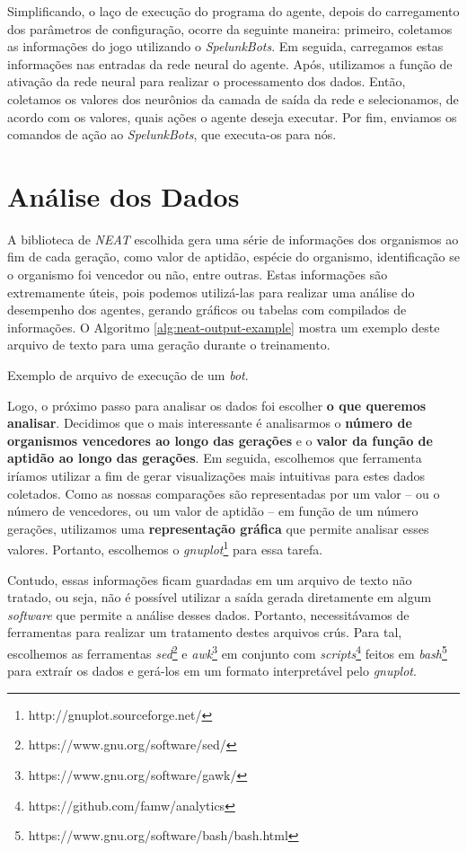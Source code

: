 Simplificando, o laço de execução do programa do agente, depois do carregamento
dos parâmetros de configuração, ocorre da seguinte maneira: primeiro, coletamos
as informações do jogo utilizando o \textit{SpelunkBots}. Em seguida, carregamos
estas informações nas entradas da rede neural do agente. Após, utilizamos a
função de ativação da rede neural para realizar o processamento dos dados.
Então, coletamos os valores dos neurônios da camada de saída da rede e
selecionamos, de acordo com os valores, quais ações o agente deseja executar.
Por fim, enviamos os comandos de ação ao \textit{SpelunkBots}, que executa-os
para nós.


\section{\label{section:analytics}Análise dos Dados}

A biblioteca de \textit{NEAT} escolhida gera uma série de informações dos
organismos ao fim de cada geração, como valor de aptidão, espécie do organismo,
identificação se o organismo foi vencedor ou não, entre outras. Estas
informações são extremamente úteis, pois podemos utilizá-las para realizar uma
análise do desempenho dos agentes, gerando gráficos ou tabelas com compilados de
informações. O Algoritmo \ref{alg:neat-output-example} mostra um exemplo deste
arquivo de texto para uma geração durante o treinamento.

\begin{algorithm}[H]

\caption[Exemplo de arquivo de execução de um \textit{bot}.]
{\label{alg:neat-output-example}Exemplo de arquivo de execução de um
    \textit{bot}.}
\end{algorithm}

Logo, o próximo passo para analisar os dados foi escolher \textbf{o que queremos
analisar}. Decidimos que o mais interessante é analisarmos o \textbf{número de
organismos vencedores ao longo das gerações} e o \textbf{valor da função de
aptidão ao longo das gerações}. Em seguida, escolhemos que ferramenta iríamos
utilizar a fim de gerar visualizações mais intuitivas para estes dados
coletados. Como as nossas comparações são representadas por um valor -- ou o
número de vencedores, ou um valor de aptidão -- em função de um número gerações,
utilizamos uma \textbf{representação gráfica} que permite analisar esses
valores. Portanto, escolhemos o
\textit{gnuplot}\footnote{http://gnuplot.sourceforge.net/} para essa tarefa.

Contudo, essas informações ficam guardadas em um arquivo de texto não tratado,
ou seja, não é possível utilizar a saída gerada diretamente em algum
\textit{software} que permite a análise desses dados. Portanto, necessitávamos
de ferramentas para realizar um tratamento destes arquivos crús.  Para tal,
escolhemos as ferramentas
\textit{sed}\footnote{https://www.gnu.org/software/sed/} e
\textit{awk}\footnote{https://www.gnu.org/software/gawk/} em conjunto com
\textit{scripts}\footnote{https://github.com/famw/analytics} feitos em
\textit{bash}\footnote{https://www.gnu.org/software/bash/bash.html} para extraír
os dados e gerá-los em um formato interpretável pelo \textit{gnuplot}.
